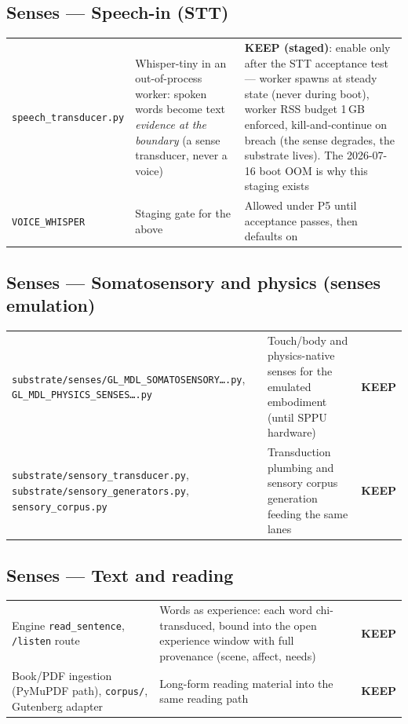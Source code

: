 \documentclass[11pt]{article}
\newcommand{\keep}{\textbf{KEEP}}
\newcommand{\keepstaged}{\textbf{KEEP (staged)}}
\begin{document}
\subsection{Senses — Speech-in (STT)}
\begin{longtable}{p{} p{} p{}}
\toprule
\texttt{speech\_transducer.py} &
Whisper-tiny in an out-of-process worker: spoken words become text
\emph{evidence at the boundary} (a sense transducer, never a voice) &
\keepstaged{}: enable only after the STT acceptance test — worker spawns at
steady state (never during boot), worker RSS budget 1\,GB enforced,
kill-and-continue on breach (the sense degrades, the substrate lives). The
2026-07-16 boot OOM is why this staging exists \\
\texttt{VOICE\_WHISPER} &
Staging gate for the above &
Allowed under P5 until acceptance passes, then defaults on \\
\bottomrule
\end{longtable}

\subsection{Senses — Somatosensory and physics (senses emulation)}
\begin{longtable}{p{} p{} p{}}
\toprule
\texttt{substrate/senses/GL\_MDL\_SOMATOSENSORY\ldots.py},
\texttt{GL\_MDL\_PHYSICS\_SENSES\ldots.py} &
Touch/body and physics-native senses for the emulated embodiment (until
SPPU hardware) &
\keep{} \\
\texttt{substrate/sensory\_transducer.py},
\texttt{substrate/sensory\_generators.py}, \texttt{sensory\_corpus.py} &
Transduction plumbing and sensory corpus generation feeding the same lanes &
\keep{} \\
\bottomrule
\end{longtable}

\subsection{Senses — Text and reading}
\begin{longtable}{p{} p{} p{}}
\toprule
Engine \texttt{read\_sentence}, \texttt{/listen} route &
Words as experience: each word chi-transduced, bound into the open
experience window with full provenance (scene, affect, needs) &
\keep{} \\
Book/PDF ingestion (PyMuPDF path), \texttt{corpus/}, Gutenberg adapter &
Long-form reading material into the same reading path &
\keep{} \\
\bottomrule
\end{longtable}
\end{document}
